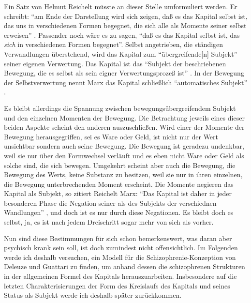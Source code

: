 \documentclass[12pt,
               paper=a4,
               twoside=false,
               onehalfspacing,
               bibliography=totoc,
               toc=graduated,
               ]{scrartcl}
\newcommand{\pc}[2]{\parencite[#1]{#2}}
\newcommand{\zn}[3]{\parencite[#1, zit. nach][#2]{#3}}
\newcommand{\dg}{Deleuze und Guattari\xspace}
\begin{document}

Ein Satz von Helmut Reichelt müsste an dieser Stelle umformuliert
werden. Er schreibt: "`am Ende der Darstellung wird sich zeigen, daß es
das Kapital selbst ist, das uns in verschiedenen Formen begegnet, die
sich alle als Momente seiner selbst erweisen"' \pc{181}{reichelt}.
Passender noch wäre es zu sagen, "`daß es das Kapital selbst ist, das
\emph{sich} in verschiedenen Formen begegnet"'. Selbst angetrieben,
die ständigen Verwandlungen überstehend, wird das Kapital zum
"`übergreifende[n] Subjekt"' \pc{169}{kap} seiner eigenen Verwertung.
Das Kapital ist das "`Subjekt der beschriebenen Bewegung, die es
selbst als sein eigner Verwertungsprozeß ist"'
\zn{Marx}{181}{reichelt}. In der Bewegung der Selbstverwertung nennt
Marx das Kapital schließlich "`automatisches Subjekt"' \pc{169}{kap}.

Es bleibt allerdings die Spannung zwischen bewegungsübergreifendem
Subjekt und den einzelnen Momenten der Bewegung. Die Betrachtung
jeweils eines dieser beiden Aspekte scheint den anderen
auszuschließen. Wird einer der Momente der Bewegung herausgegriffen,
sei es Ware oder Geld, ist nicht nur der Wert unsichtbar sondern auch
seine Bewegung. Die Bewegung ist geradezu undenkbar, weil sie nur über
den Formwechsel verläuft und es eben nicht Ware oder Geld als solche
sind, die sich bewegen. Umgekehrt scheint aber auch die Bewegung, die
Bewegung des Werts, keine Substanz zu besitzen, weil sie nur in ihren
einzelnen, die Bewegung unterbrechenden Moment erscheint. Die Momente
negieren das Kapital als Subjekt, so zitiert Reichelt Marx: "`Das
Kapital ist daher in jeder besonderen Phase die Negation seiner als
des Subjekts der verschiednen Wandlungen"' \zn{Marx}{181}{reichelt},
und doch ist es nur durch diese Negationen. Es bleibt doch es selbst,
ja, es ist nach jedem Dreischritt sogar mehr von sich als vorher.

Nun sind diese Bestimmungen für sich schon bemerkenswert, was daran
aber psychisch krank sein soll, ist doch zumindest nicht
offensichtlich. Im Folgenden werde ich deshalb versuchen, ein Modell
für die Schizophrenie-Konzeption von \dg zu finden, um anhand dessen
die schizophrenen Strukturen in der allgemeinen Formel des Kapitals
herauszuarbeiten. Insbesondere auf die letzten Charakterisierungen der
Form des Kreislaufs des Kapitals und seines Status als Subjekt werde
ich deshalb später zurückkommen.

\end{document}
